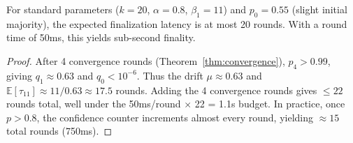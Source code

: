 \begin{proposition}
\label{prop:latency}
For standard parameters ($k = 20$, $\alpha = 0.8$, $\beta_1 = 11$) and $p_0 = 0.55$
(slight initial majority), the expected finalization latency is at most 20 rounds.
With a round time of 50ms, this yields sub-second finality.
\end{proposition}

\begin{proof}
After 4 convergence rounds (Theorem~\ref{thm:convergence}), $p_4 > 0.99$, giving
$q_1 \approx 0.63$ and $q_0 < 10^{-6}$. Thus the drift $\mu \approx 0.63$ and
$\mathbb{E}[\tau_{11}] \approx 11/0.63 \approx 17.5$ rounds. Adding the 4 convergence
rounds gives $\leq 22$ rounds total, well under the 50ms/round $\times$ 22 = 1.1s budget.
In practice, once $p > 0.8$, the confidence counter increments almost every round,
yielding $\approx 15$ total rounds (750ms).
\end{proof}

